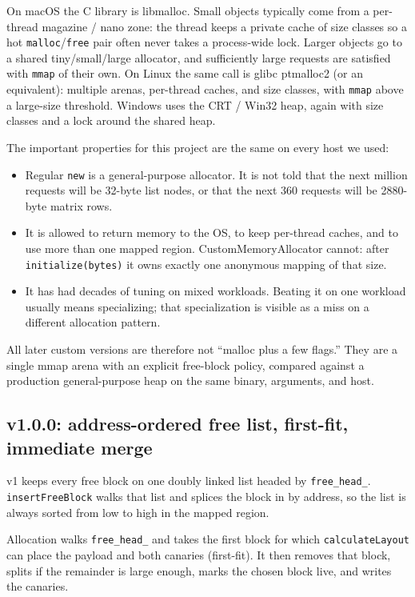 On macOS the C library is libmalloc.
Small objects typically come from a per-thread magazine / nano zone: the
thread keeps a private cache of size classes so a hot \texttt{malloc}/\texttt{free}
pair often never takes a process-wide lock.
Larger objects go to a shared tiny/small/large allocator, and sufficiently
large requests are satisfied with \texttt{mmap} of their own.
On Linux the same call is glibc ptmalloc2 (or an equivalent): multiple arenas,
per-thread caches, and size classes, with \texttt{mmap} above a large-size
threshold.
Windows uses the CRT / Win32 heap, again with size classes and a lock around
the shared heap.

The important properties for this project are the same on every host we used:

\begin{itemize}
  \item Regular \texttt{new} is a general-purpose allocator.
    It is not told that the next million requests will be 32-byte list nodes,
    or that the next 360 requests will be 2880-byte matrix rows.
  \item It is allowed to return memory to the OS, to keep per-thread caches,
    and to use more than one mapped region.
    CustomMemoryAllocator cannot: after \texttt{initialize(bytes)} it owns
    exactly one anonymous mapping of that size.
  \item It has had decades of tuning on mixed workloads.
    Beating it on one workload usually means specializing; that specialization
    is visible as a miss on a different allocation pattern.
\end{itemize}

All later custom versions are therefore not ``malloc plus a few flags.''
They are a single mmap arena with an explicit free-block policy, compared
against a production general-purpose heap on the same binary, arguments, and
host.

\subsection{v1.0.0: address-ordered free list, first-fit, immediate merge}

v1 keeps every free block on one doubly linked list headed by
\texttt{free\_head\_}.
\texttt{insertFreeBlock} walks that list and splices the block in by address, so
the list is always sorted from low to high in the mapped region.

Allocation walks \texttt{free\_head\_} and takes the first block for which
\texttt{calculateLayout} can place the payload and both canaries
(first-fit).
It then removes that block, splits if the remainder is large enough, marks the
chosen block live, and writes the canaries.


